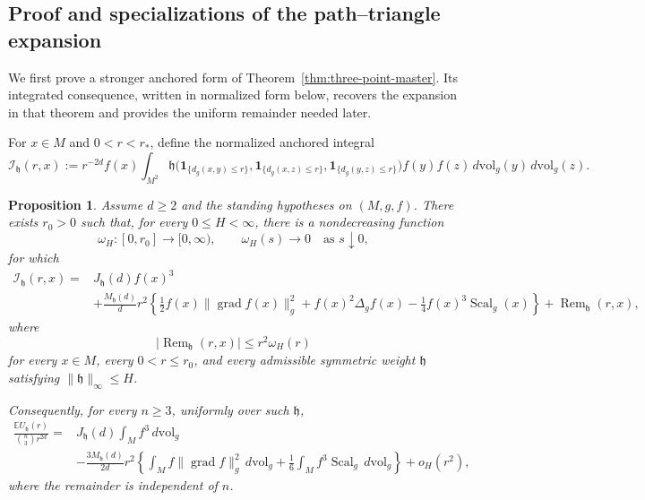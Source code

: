 \documentclass[11pt]{article}
\newtheorem{proposition}[theorem]{Proposition}
\theoremstyle{remark}
\newcommand{\Scal}{\operatorname{Scal}}
\newcommand{\grad}{\operatorname{grad}}
\newcommand{\ind}{\mathbf 1}
\newcommand{\E}{\mathbb E}
\numberwithin{equation}{section}
\begin{document}
\subsection{Proof and specializations of the path--triangle expansion}
\label{subsec:three-point-master}

We first prove a stronger anchored form of
Theorem~\ref{thm:three-point-master}.  Its integrated consequence, written
in normalized form below, recovers the expansion in that theorem and provides
the uniform remainder needed later.

For $x\in M$ and $0<r<r_*$, define the normalized anchored integral
\[
\mathcal I_{\mathfrak h}(r,x)
:=r^{-2d}f(x)\int_{M^2}
\mathfrak h\!\Big(
\ind_{\{d_g(x,y)\le r\}},
\ind_{\{d_g(x,z)\le r\}},\ind_{\{d_g(y,z)\le r\}}
\Big)
f(y)f(z)\,d\mathrm{vol}_g(y)\,d\mathrm{vol}_g(z).
\]

\begin{proposition}
\label{prop:three-point-anchored}
Assume \(d\ge2\) and the standing hypotheses on \((M,g,f)\).
There exists \(r_0>0\) such that, for every \(0\le H<\infty\), there is a
nondecreasing function
\[
\omega_H:[0,r_0]\longrightarrow[0,\infty),
\qquad
\omega_H(s)\longrightarrow0
\quad\text{as }s\downarrow0,
\]
for which
\[
\begin{aligned}
\mathcal I_{\mathfrak h}(r,x)
={}&
J_{\mathfrak h}(d)f(x)^3\\
&+
\frac{M_{\mathfrak h}(d)}{d}r^2
\left\{
\frac12 f(x)\|\grad f(x)\|_g^2
+
f(x)^2\Delta_g f(x)
-
\frac14 f(x)^3\Scal_g(x)
\right\}+
\operatorname{Rem}_{\mathfrak h}(r,x),
\end{aligned}
\]
where
\[
\bigl|
\operatorname{Rem}_{\mathfrak h}(r,x)
\bigr|
\le
r^2\omega_H(r)
\]
for every \(x\in M\), every \(0<r\le r_0\), and every admissible
symmetric weight \(\mathfrak h\) satisfying
\(\|\mathfrak h\|_\infty\le H\).

Consequently, for every \(n\ge3\), uniformly over such \(\mathfrak h\),
\[
\begin{aligned}
\frac{\E U_{\mathfrak h}(r)}
{\binom{n}{3}r^{2d}}
={}&
J_{\mathfrak h}(d)\int_M f^3\,d\mathrm{vol}_g\\
&-
\frac{3M_{\mathfrak h}(d)}{2d}r^2
\left\{
\int_M f\|\grad f\|_g^2\,d\mathrm{vol}_g
+
\frac16\int_M f^3\Scal_g\,d\mathrm{vol}_g
\right\}
+
o_H(r^2),
\end{aligned}
\]
where the remainder is independent of \(n\).
\end{proposition}
\end{document}
